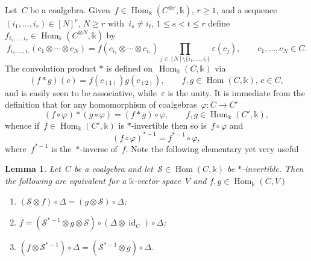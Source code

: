 \documentclass[12pt, reqno]{amsart}
\newtheorem{lemma}[theorem]{Lemma}
\theoremstyle{definition}
\numberwithin{equation}{section}
\newcommand{\tensor}{\otimes}
\newcommand{\kk}{\mathbb{k}}\newcommand{\lie}[1]{{\mathfrak{#1}}}
\newenvironment{enumrom}{\begin{enumerate}[label={\rm(\roman*)},leftmargin=*]}{\end{enumerate}}
\DeclareMathOperator{\id}{id}
\DeclareMathOperator{\Hom}{Hom}
\begin{document}
Let~$C$ be a coalgebra.  
Given~$f\in\Hom_\kk(C^{\tensor r},\kk)$, $r\ge 1$,
and a sequence~$(i_1,\dots,i_r)\in [N]^r$, $N\ge r$
with~$i_s\not=i_t$, $1\le s<t\le r$
define~$f_{i_1,\dots,i_r}\in\Hom_\kk(C^{\tensor N},\kk)$
by
$$
f_{i_1,\dots,i_r}(c_1\tensor \cdots\tensor c_N)=
f(c_{i_1}\tensor\cdots\tensor c_{i_r})\prod_{j\in [N]\setminus \{i_1,\dots,i_r\}} \varepsilon(c_j),
\qquad c_1,\dots,c_N\in C.
$$
The convolution product $\ast$ is defined on~$\Hom_\kk(C,\kk)$ via
$$
(f\ast g)(c)=f(c_{(1)})g(c_{(2)}),\qquad 
f,g\in\Hom(C,\kk),\,c\in C,
$$
and is easily seen to be associative, while~$\varepsilon$ is the unity. It is immediate from the definition that for any homomorphism of coalgebras~$\varphi:C\to C'$
\begin{equation}\label{eq:hom coalg}
(f\circ \varphi)\ast (g\circ \varphi)=(f\ast g)\circ\varphi,\qquad f,g\in\Hom_\kk(C',\kk),
\end{equation}
whence if~$f\in \Hom_\kk(C',\kk)$ is $\ast$-invertible
then so is~$f\circ\varphi$
and 
\begin{equation}\label{eq:hom coalg inv}
(f\circ \varphi)^{\ast-1}=f^{\ast-1}\circ\varphi,
\end{equation}
where~$f^{\ast-1}$ is the~$\ast$-inverse of~$f$.
Note the following
elementary yet very useful 
\begin{lemma}\label{lem:old mult from twisted}
Let~$C$ be a coalgebra and let~$\mathcal S\in\Hom(C,\kk)$
be $\ast$-invertible.
Then the following are equivalent for
a $\kk$-vector space~$V$ and $f,g\in\Hom_\kk(C,V)$
\begin{enumrom}
\item\label{lem:old mult from twisted.i} $(\mathcal S\tensor f)\circ\Delta=(g\tensor\mathcal S)\circ\Delta$; \item\label{lem:old mult from twisted.ii}
$f=(\mathcal S^{\ast-1}\tensor g\tensor \mathcal S)\circ(\Delta\tensor\id_C)\circ\Delta$;
\item\label{lem:old mult from twisted.iii}
$(f\tensor \mathcal S^{\ast -1})\circ\Delta=
(\mathcal S^{\ast-1}\tensor g)\circ\Delta$.
\end{enumrom}
\end{lemma}
\end{document}
